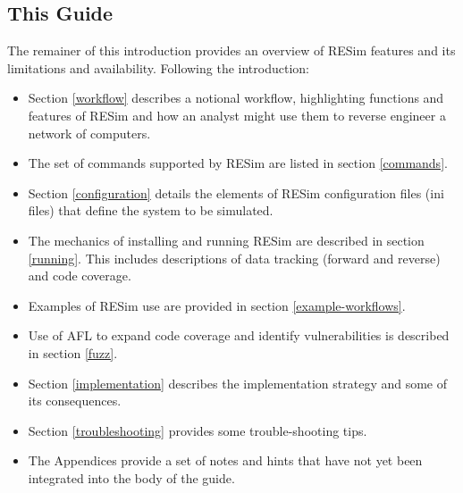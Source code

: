 \documentclass[titlepage]{article}
\begin{document}
\subsection{This Guide}
The remainer of this introduction provides an overview of RESim features and its limitations and availability.  Following the introduction:
\begin{itemize}
\item Section \ref{workflow} 
describes a notional workflow, highlighting functions and features of RESim and how an analyst might use them to reverse engineer a 
network of computers.  
\item The set of commands supported by RESim are listed in section \ref{commands}.  
\item Section \ref{configuration} details
the elements of RESim configuration files (ini files) that define the system to be simulated.  
\item The mechanics of installing and running 
RESim are described in section \ref{running}.  This includes descriptions of data tracking (forward and reverse) and code coverage. 
\item Examples of RESim use are provided in section \ref{example-workflows}.  
\item Use of AFL to expand code coverage and identify vulnerabilities is described in section \ref{fuzz}.
\item Section \ref{implementation} describes the implementation strategy and some of its consequences.
\item Section \ref{troubleshooting} provides some trouble-shooting tips.
\item The Appendices provide a set of notes and hints that have not yet been integrated into the body of the guide.
\end{itemize}
\end{document}
